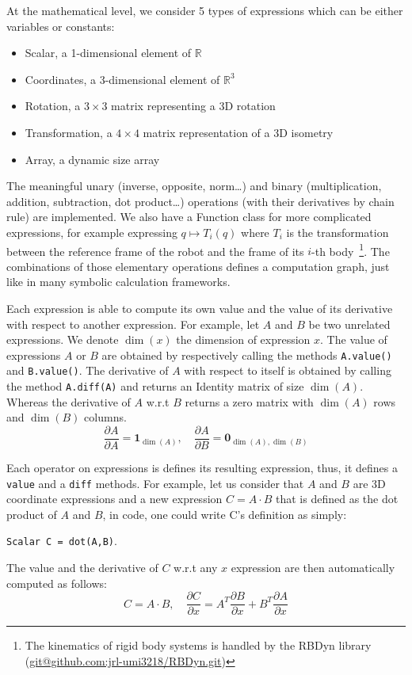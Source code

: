 At the mathematical level, we consider 5 types of expressions which can be either variables or constants:
\begin{itemize}
  \item Scalar, a 1-dimensional element of $\mathbb{R}$
  \item Coordinates, a 3-dimensional element of $\mathbb{R}^3$
  \item Rotation, a $3\times3$ matrix representing a 3D rotation
  \item Transformation, a $4\times4$ matrix representation of a 3D isometry
  \item Array, a dynamic size array
\end{itemize}
The meaningful unary (inverse, opposite, norm\ldots) and binary (multiplication, addition, subtraction, dot product\ldots) operations (with their derivatives by chain rule) are implemented.
We also have a Function class for more complicated expressions, for example expressing $q \mapsto T_i(q)$ where $T_i$ is the transformation between the reference frame of the robot and the frame of its $i$-th body~\footnote{The kinematics of rigid body systems is handled by the RBDyn library (\url{git@github.com:jrl-umi3218/RBDyn.git})}.
The combinations of those elementary operations defines a computation graph, just like in many symbolic calculation frameworks.

Each expression is able to compute its own value and the value of its derivative with respect to another expression.
For example, let $A$ and $B$ be two unrelated expressions.
We denote $\dim(x)$ the dimension of expression $x$.
The value of expressions $A$ or $B$ are obtained by respectively calling the methods {\tt A.value()} and {\tt B.value()}.
The derivative of $A$ with respect to itself is obtained by calling the method {\tt A.diff(A)} and returns an Identity matrix of size $\dim(A)$.
Whereas the derivative of $A$ w.r.t $B$ returns a zero matrix with $\dim(A)$ rows and $\dim(B)$ columns.
\begin{equation}\nonumber
  \frac{\partial A}{\partial A} = \mathbf{1}_{\dim(A)}, \quad \frac{\partial A}{\partial B} = \mathbf{0}_{\dim(A),\dim(B)}
\end{equation}

Each operator on expressions is defines its resulting expression, thus, it defines a {\tt value} and a {\tt diff} methods.
For example, let us consider that $A$ and $B$ are 3D coordinate expressions and a new expression $C = A\cdot B$ that is defined as the dot product of $A$ and $B$, in code, one could write C's definition as simply:
\begin{center}
{\tt Scalar C = dot(A,B)}.
\end{center}
The value and the derivative of $C$ w.r.t any $x$ expression are then automatically computed as follows:
\begin{equation}
\label{eq:dot}
  C = A\cdot B,\quad \frac{\partial C}{\partial x} = A^T\frac{\partial B}{\partial x} + B^T\frac{\partial A}{\partial x}
\end{equation}

